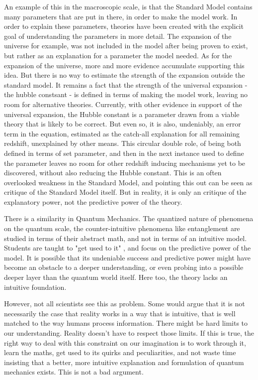 \documentclass[notitlepage]{report}
\begin{document}
An example of this in the macroscopic scale, is that the Standard Model contains many parameters that are put in there, in order to make the model work. In order to explain these parameters, theories have been created with the explicit goal of understanding the parameters in more detail. The expansion of the universe for example,  was not included in the model after being proven to exist, but rather as an explanation for a parameter the model needed. As for the expansion of the universe, more and more evidence accumulate supporting this idea. But there is no way to estimate the strength of the expansion outside the standard model. It remains a fact that the strength of the universal expansion - the hubble constsant - is defined in terms of making the model work, leaving no room for alternative theories. Currently, with other evidence in support of the universal expansion, the Hubble constant is a parameter drawn from a viable theory that is likely to be correct. But even so, it is also, undeniably, an error term in the equation, estimated as the catch-all explanation for all remaining redshift, unexplained by other means.  This circular double role, of being both defined in terms of set parameter, and then in the next instance used to define the parameter leaves no room for other redshift inducing mechanisms yet to be discovered, without also reducing the Hubble constant. This is an often overlooked weakness in the Standard Model, and pointing this out can be seen as critique of the Standard Model itself. But in reality, it is only an critique of the explanatory power, not the predictive power of the theory.

There is a similarity in Quantum Mechanics. The quantized nature of phenomena on the quantum scale, the counter-intuitive phenomena like entanglement are studied in terms of their abstract math, and not in terms of an intuitive model. Students are taught to "get used to it" , and focus on the predictive power of the model.  It is possible that its undeniable success and predictive power might have become an obstacle to a deeper understanding, or even probing into a possible deeper layer than the quantum world itself. Here too, the theory lacks an intuitive foundation.

However, not all scientists see this as  problem. Some would argue that it is not necessarily the case that reality works in a way that is intuitive, that is well matched to the way humans process information. There might be hard limits to our understanding. Reality doesn't have to respect those limits. If this is true, the right way to deal with this constraint on our imagination is to work through it, learn the maths, get used to its quirks and peculiarities, and not waste time insisting that a better, more intuitive explanation and formulation of quantum mechanics exists. This is not a bad argument. 
\end{document}
